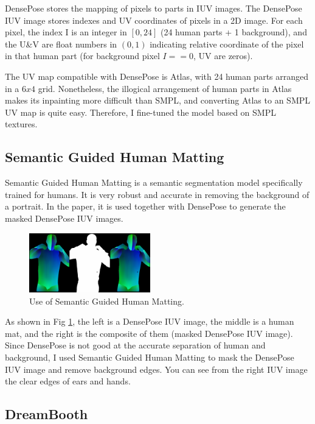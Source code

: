 \documentclass[acmtog]{acmart}
\begin{document}
DensePose stores the mapping of pixels to parts in IUV images. The DensePose IUV image stores indexes and UV coordinates of pixels in a 2D image. For each pixel, the index I is an integer in \([0,24]\) (24 human parts + 1 background), and the U\&V are float numbers in \((0,1)\) indicating relative coordinate of the pixel in that human part (for background pixel \(I==0\), UV are zeros).

The UV map compatible with DensePose is Atlas, with 24 human parts arranged in a \(6x4\) grid. Nonetheless, the illogical arrangement of human parts in Atlas makes its inpainting more difficult than SMPL, and converting Atlas to an SMPL UV map is quite easy. Therefore, I fine-tuned the model based on SMPL textures.

\subsection{Semantic Guided Human Matting}

Semantic Guided Human Matting \cite{chen2022robust} is a semantic segmentation model specifically trained for humans. It is very robust and accurate in removing the background of a portrait. In the paper, it is used together with DensePose to generate the masked DensePose IUV images.

\begin{figure}[h]
  \centering
  \includegraphics[width=0.47\textwidth]{figs/human_matting.png}
  \caption{Use of Semantic Guided Human Matting.}
  \label{fig:human_mat}
\end{figure}

As shown in Fig \ref{fig:human_mat}, the left is a DensePose IUV image, the middle is a human mat, and the right is the composite of them (masked DensePose IUV image). Since DensePose is not good at the accurate separation of human and background, I used Semantic Guided Human Matting to mask the DensePose IUV image and remove background edges. You can see from the right IUV image the clear edges of ears and hands.

\subsection{DreamBooth}
\end{document}
